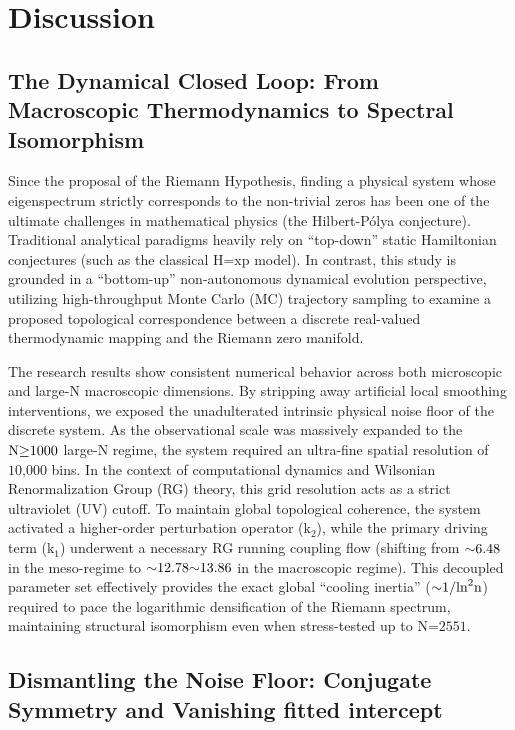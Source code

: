 \documentclass[fractalfract,article,submit,oneauthor,pdftex]{Definitions/mdpi}
\begin{document}
\section{Discussion}

\subsection{The Dynamical Closed Loop: From Macroscopic Thermodynamics to Spectral Isomorphism}

Since the proposal of the Riemann Hypothesis, finding a physical system
whose eigenspectrum strictly corresponds to the non-trivial zeros has
been one of the ultimate challenges in mathematical physics (the
Hilbert-P\'olya conjecture). Traditional analytical paradigms heavily rely
on ``top-down'' static Hamiltonian conjectures (such as the classical
\(\text{H}\text{=}\text{xp}\) model). In contrast, this study is
grounded in a ``bottom-up'' non-autonomous dynamical evolution
perspective, utilizing high-throughput Monte Carlo (MC) trajectory
sampling to examine a proposed topological
correspondence between a discrete real-valued thermodynamic mapping and the
Riemann zero manifold.

The research results show consistent numerical behavior across both
microscopic and large-N macroscopic dimensions. By stripping away
artificial local smoothing interventions, we exposed the unadulterated
intrinsic physical noise floor of the discrete system. As the
observational scale was massively expanded to the
\(\text{N}\text{\ensuremath{\ge}1000}\) large-N regime, the system required an
ultra-fine spatial resolution of \(\text{10,000}\) bins. In the context
of computational dynamics and Wilsonian Renormalization Group (RG)
theory, this grid resolution acts as a strict ultraviolet (UV) cutoff.
To maintain global topological coherence, the system activated a
higher-order perturbation operator (\(\text{k}_{\text{2}}\)), while the
primary driving term (\(\text{k}_{\text{1}}\)) underwent a necessary RG
running coupling flow (shifting from \(\text{\ensuremath{\sim}6.48}\) in the meso-regime
to \(\text{\ensuremath{\sim}12.78\ensuremath{\sim}13.86}\) in the macroscopic regime). This decoupled
parameter set effectively provides the exact global ``cooling inertia''
(\(\text{\ensuremath{\sim}1/}\text{ln}^{\text{2}}\text{n}\)) required to pace the
logarithmic densification of the Riemann spectrum, maintaining
structural isomorphism even when stress-tested up to
\(\text{N}\text{=2551}\).

\subsection{Dismantling the Noise Floor: Conjugate Symmetry and Vanishing fitted intercept}
\end{document}
